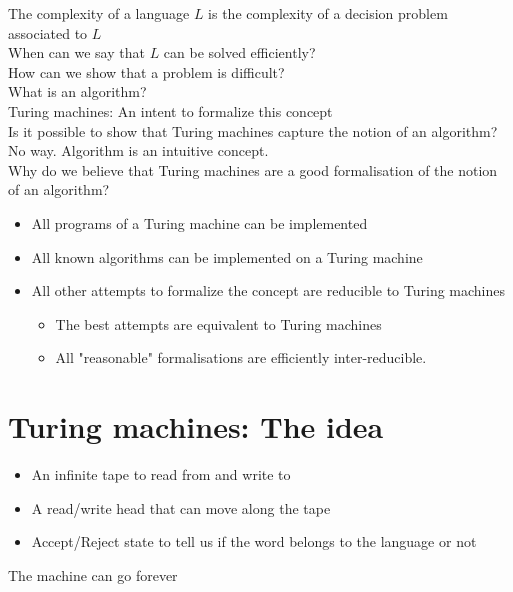     The complexity of a language $L$ is the complexity of a decision problem associated to $L$\\

    When can we say that $L$ can be solved efficiently?\\

    How can we show that a problem is difficult?\\

    What is an algorithm?\\
    Turing machines: An intent to formalize this concept\\
    Is it possible to show that Turing machines capture the notion of an algorithm?\\
    No way. Algorithm is an intuitive concept.\\ %
    Why do we believe that Turing machines are a good formalisation of the notion of an algorithm?
    \begin{itemize}
        \item All programs of a Turing machine can be implemented

        \item All known algorithms can be implemented on a Turing machine
        
        \item All other attempts to formalize the concept are reducible to Turing machines
        \begin{itemize}
            \item The best attempts are equivalent to Turing machines

            \item All "reasonable" formalisations are efficiently inter-reducible.
        \end{itemize}
    \end{itemize}

    \section{Turing machines: The idea}
    \begin{itemize}
        \item An infinite tape to read from and write to

        \item A read/write head that can move along the tape

        \item Accept/Reject state to tell us if the word belongs to the language or not
    \end{itemize}
    \begin{obs}
        The machine can go forever
    \end{obs}

